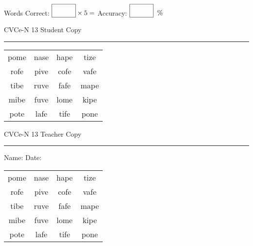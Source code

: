 \documentclass{memoir}
\begin{document}
\small

Words Correct: $\fbox{\phantom{\huge 100}} \times 5 = $ Accuracy: $\fbox{\phantom{\huge 100}}\;\; \%$ 

\vfill

\newpage


\footnotesize \noindent
CVCe-N 13 \hfill Student Copy
\smallskip
\hrule

\Large

\setlength{\tabcolsep}{14pt}
\def\arraystretch{2}

{\selectfont


\begin{vplace}[0.5]
\begin{center}
\begin{tabular}{cccc}
pome & nase & hape & tize \\
rofe & pive & cofe & vafe \\
tibe & ruve & fafe & mape \\
mibe & fuve & lome & kipe \\
pote & lafe & tife & pone \\
\end{tabular}
\end{center}
\end{vplace}

}

\newpage

\footnotesize \noindent
CVCe-N 13 \hfill Teacher Copy
\smallskip
\hrule

\small

\vfill

\noindent
Name: \underline{\hspace{1.75in}} \hfill Date: \underline{\hspace{1in}}

\Large

{\selectfont


\begin{vplace}[0.5]
\begin{center}
\begin{tabular}{cccc}
pome & nase & hape & tize \\
rofe & pive & cofe & vafe \\
tibe & ruve & fafe & mape \\
mibe & fuve & lome & kipe \\
pote & lafe & tife & pone \\
\end{tabular}
\end{center}
\end{vplace}



}
\end{document}

